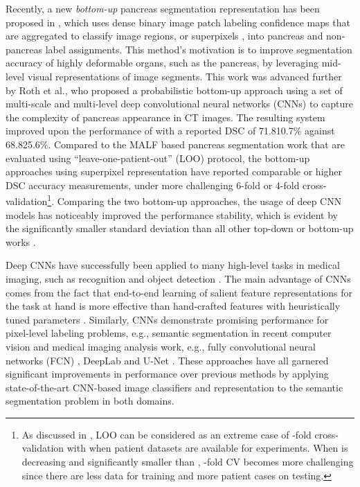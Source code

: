 \documentclass[journal]{IEEEtran}
\begin{document}
Recently, a new {\em bottom-up} pancreas segmentation representation has been proposed in \cite{farag2014bottom}, which uses dense binary image patch labeling confidence maps that are aggregated to classify image regions, or superpixels \cite{Felzenszwalb2004Efficient,pont-tuset2015mcg,Girshick2016Region}, into pancreas and non-pancreas label assignments. This method's motivation is to improve segmentation accuracy of highly deformable organs, such as the pancreas, by leveraging mid-level visual representations of image segments. This work was advanced further by Roth et al.\cite{roth2015deeporgan}, who proposed a probabilistic bottom-up approach using a set of multi-scale and multi-level deep convolutional neural networks (CNNs) to capture the complexity of pancreas appearance in CT images. The resulting system improved upon the performance of \cite{farag2014bottom} with a reported DSC of 71.810.7\% against 68.825.6\%. Compared to the MALF based pancreas segmentation work \cite{wolz2013automated,Chu2013Miccai,tong2015discriminative,okada2015abdominal} that are evaluated using ``leave-one-patient-out'' (LOO) protocol, the bottom-up approaches using superpixel representation \cite{farag2014bottom,roth2015deeporgan} have reported comparable or higher DSC accuracy measurements, under more challenging 6-fold or 4-fold cross-validation\footnote{As discussed in \cite{Shin2016Deep}, LOO can be considered as an extreme case of -fold cross-validation with  when  patient datasets are available for experiments. When  is decreasing and significantly smaller than , -fold CV becomes more challenging since there are less data for training and more patient cases on testing.}. Comparing the two bottom-up approaches, the usage of deep CNN models has noticeably improved the performance stability, which is evident by the significantly smaller standard deviation \cite{roth2015deeporgan} than all other top-down or bottom-up works \cite{farag2014bottom,wolz2013automated,Chu2013Miccai,tong2015discriminative,okada2015abdominal}.  

Deep CNNs have successfully been applied to many high-level tasks in medical imaging, such as recognition and object detection \cite{yan2015bodypart}. The main advantage of CNNs comes from the fact that end-to-end learning of salient feature representations for the task at hand is more effective than hand-crafted features with heuristically tuned parameters \cite{zheng2015conditional}. Similarly, CNNs demonstrate promising performance for pixel-level labeling problems, e.g., semantic segmentation in recent computer vision and medical imaging analysis work, e.g., fully convolutional neural networks (FCN) \cite{long2015fully}, DeepLab \cite{chen2014semantic} and U-Net \cite{ronneberger2015unet}. These approaches have all garnered significant improvements in performance over previous methods by applying state-of-the-art CNN-based image classifiers and representation to the semantic segmentation problem in both domains. 
\end{document}
